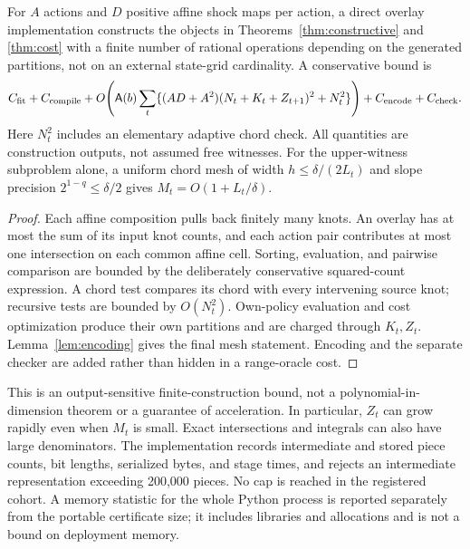 \begin{proposition}\label{prop:work}
For $A$ actions and $D$ positive affine shock maps per action, a direct overlay implementation constructs the objects in Theorems~\ref{thm:constructive} and \ref{thm:cost} with a finite number of rational operations depending on the generated partitions, not on an external state-grid cardinality. A conservative bound is
\begin{equation}\label{eq:work}
 C_{\rm fit}+C_{\rm compile}
 +O\!\left(\mathsf A(b)\sum_t
 \{(AD+A^2)(N_t+K_t+Z_{t+1})^2+N_t^2\}\right)
 +C_{\rm encode}+C_{\rm check}.
\end{equation}
Here $N_t^2$ includes an elementary adaptive chord check. All quantities are construction outputs, not assumed free witnesses. For the upper-witness subproblem alone, a uniform chord mesh of width $h\le\delta/(2L_t)$ and slope precision $2^{1-q}\le\delta/2$ gives $M_t=O(1+L_t/\delta)$.
\end{proposition}
\begin{proof}
Each affine composition pulls back finitely many knots. An overlay has at most the sum of its input knot counts, and each action pair contributes at most one intersection on each common affine cell. Sorting, evaluation, and pairwise comparison are bounded by the deliberately conservative squared-count expression. A chord test compares its chord with every intervening source knot; recursive tests are bounded by $O(N_t^2)$. Own-policy evaluation and cost optimization produce their own partitions and are charged through $K_t,Z_t$. Lemma~\ref{lem:encoding} gives the final mesh statement. Encoding and the separate checker are added rather than hidden in a range-oracle cost.\end{proof}

This is an output-sensitive finite-construction bound, not a polynomial-in-dimension theorem or a guarantee of acceleration. In particular, $Z_t$ can grow rapidly even when $M_t$ is small. Exact intersections and integrals can also have large denominators. The implementation records intermediate and stored piece counts, bit lengths, serialized bytes, and stage times, and rejects an intermediate representation exceeding 200,000 pieces. No cap is reached in the registered cohort. A memory statistic for the whole Python process is reported separately from the portable certificate size; it includes libraries and allocations and is not a bound on deployment memory.

